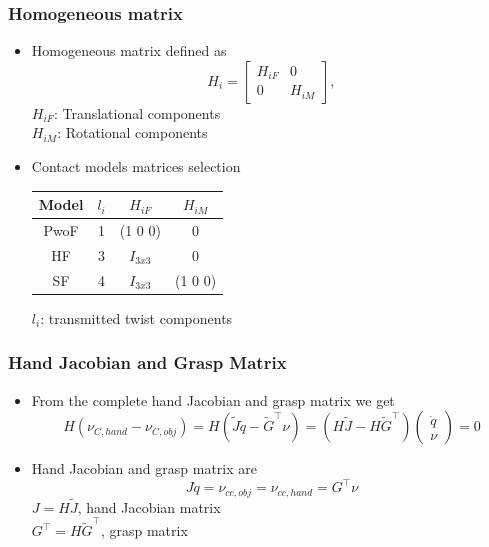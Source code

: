 \documentclass{beamer}
\begin{document}

\begin{frame}
\frametitle{Homogeneous matrix}
\begin{itemize}
\item Homogeneous matrix defined as
\begin{equation*}
H_i= \begin{bmatrix}
H_{iF} & 0\\
0 & H_{iM}
\end{bmatrix}, 
\end{equation*}
$H_{iF}$: Translational components \\
$H_{iM}$: Rotational components
\item Contact models matrices selection
\begin{table}
\begin{tabular}{|c|c|c|c|}
\hline \scriptsize{Model} &  \scriptsize{$l_i$} & \scriptsize{$H_{iF}$} & \scriptsize{$H_{iM}$} \\
\hline \scriptsize{PwoF} & \scriptsize{1}  & \scriptsize{(1 0 0)} & \scriptsize{0} \\
\hline \scriptsize{HF} & \scriptsize{3}  & \scriptsize{$I_{3x3}$} & \scriptsize{0}  \\
\hline \scriptsize{SF} & \scriptsize{4} & \scriptsize{$I_{3x3}$} & \scriptsize{(1 0 0)} \\
\hline
\end{tabular}
\end{table}
$l_i$: transmitted twist components 
\end{itemize}

\end{frame}


\begin{frame}
\frametitle{Hand Jacobian and Grasp Matrix}
\begin{itemize}
\item From the complete hand Jacobian and grasp matrix we get
\begin{equation*}
H(\nu_{C,hand} - \nu_{C,obj})=H(\tilde{J}\dot{q} -\tilde{G}^{\intercal}\nu)=(H\tilde{J}-H\tilde{G}^{\intercal})\begin{pmatrix}
\dot{q}\\
\nu
\end{pmatrix}=0
\end{equation*}
\item Hand Jacobian and grasp matrix are
\begin{equation*}
J\dot{q}=\nu_{cc,obj}=\nu_{cc,hand}=G^{\intercal}\nu
\end{equation*}
$J=H\tilde{J}$, hand Jacobian matrix\\
$G^{\intercal}=H\tilde{G}^{\intercal}$, grasp matrix\\
\end{itemize}

\end{frame}
\end{document}
